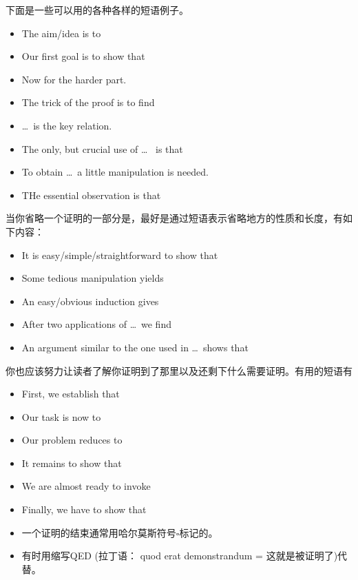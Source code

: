 \documentclass[fontset=mac]{ctexbeamer}
\begin{document}
\begin{frame}
下面是一些可以用的各种各样的短语例子。
\begin{itemize}
\item The aim/idea is to 
\item Our first goal is to show that 
\item Now for the harder part.
\item The trick of the proof is to find
\item \dots ~is the key relation.
\item The only, but crucial use of  \dots~ is that 
\item To obtain \dots ~a little manipulation is needed.
\item THe essential observation is that 
\end{itemize}
\end{frame}


\begin{frame}
当你省略一个证明的一部分是，最好是通过短语表示省略地方的性质和长度，有如下内容：
	\begin{itemize}
		\item It is easy/simple/straightforward to show that 
		\item Some tedious manipulation yields
		\item An easy/obvious induction gives 
		\item After two applications of  \dots ~we find
		\item An argument similar to the one used in  \dots ~shows that 
	\end{itemize}
\end{frame}

\begin{frame}
你也应该努力让读者了解你证明到了那里以及还剩下什么需要证明。有用的短语有
	\begin{itemize}
		\item First, we establish that 
		\item Our task is now to 
		\item Our problem reduces to 
		\item It remains to show that 
		\item We are almost ready to invoke 
		\item Finally, we have to show that 
	\end{itemize}
\end{frame}

\begin{frame}
\begin{itemize}
\item 
一个证明的结束通常用哈尔莫斯符号$\square$标记的。
\item 
有时用缩写QED  (拉丁语： quod erat demonstrandum = 这就是被证明了)代替。
\end{itemize}
\end{frame}
\end{document}
